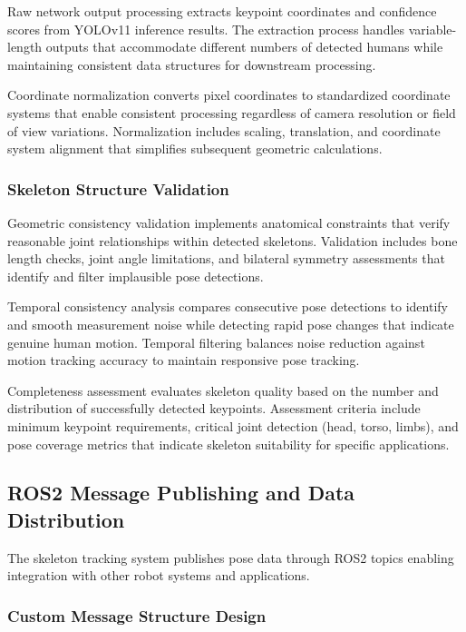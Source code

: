 Raw network output processing extracts keypoint coordinates and confidence scores from YOLOv11 inference results. The extraction process handles variable-length outputs that accommodate different numbers of detected humans while maintaining consistent data structures for downstream processing.

Coordinate normalization converts pixel coordinates to standardized coordinate systems that enable consistent processing regardless of camera resolution or field of view variations. Normalization includes scaling, translation, and coordinate system alignment that simplifies subsequent geometric calculations.

\subsubsection{Skeleton Structure Validation}

Geometric consistency validation implements anatomical constraints that verify reasonable joint relationships within detected skeletons. Validation includes bone length checks, joint angle limitations, and bilateral symmetry assessments that identify and filter implausible pose detections.

Temporal consistency analysis compares consecutive pose detections to identify and smooth measurement noise while detecting rapid pose changes that indicate genuine human motion. Temporal filtering balances noise reduction against motion tracking accuracy to maintain responsive pose tracking.

Completeness assessment evaluates skeleton quality based on the number and distribution of successfully detected keypoints. Assessment criteria include minimum keypoint requirements, critical joint detection (head, torso, limbs), and pose coverage metrics that indicate skeleton suitability for specific applications.

\subsection{ROS2 Message Publishing and Data Distribution}

The skeleton tracking system publishes pose data through ROS2 topics enabling integration with other robot systems and applications.

\subsubsection{Custom Message Structure Design}

